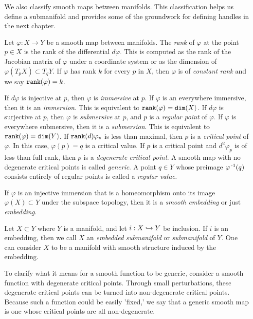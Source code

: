 We also classify smooth maps between manifolds.
This classification helps us define a submanifold and provides some of the groundwork for defining handles in the next chapter.

\begin{defn}[Embedding]
	Let $\varphi:X\to Y$ be a smooth map between manifolds.
	The \emph{rank} of $\varphi$ at the point $p\in X$ is the rank of the differential $d\varphi$.
	This is computed as the rank of the Jacobian matrix of $\varphi$ under a coordinate system or as the dimension of $\varphi(T_p X)\subset T_q Y$.
	If $\varphi$ has rank $k$ for every $p$ in $X$, then $\varphi$ is of \emph{constant rank} and we say $\texttt{rank}(\varphi)=k$.
	 
	If $d\varphi$ is injective at $p$, then $\varphi$ is \emph{immersive} at $p$.
	If $\varphi$ is an everywhere immersive, then it is an \emph{immersion}.
	This is equivalent to $\texttt{rank}(\varphi)=\texttt{dim}(X)$.
	If $d\varphi$ is surjective at $p$, then $\varphi$ is \emph{submersive} at $p$, and $p$ is a \emph{regular point} of $\varphi$.
	If $\varphi$ is everywhere submersive, then it is a \emph{submersion}.
	This is equivalent to $\texttt{rank}(\varphi)=\texttt{dim}(Y)$.
	If $\texttt{rank}(d)\varphi_p$ is less than maximal, then $p$ is a \emph{critical point} of $\varphi$.
	In this case, $\varphi(p)=q$ is a critical value.
	If $p$ is a critical point and $d^2\varphi_p$ is of less than full rank, then $p$ is a \emph{degenerate critical point}.
	A smooth map with no degenerate critical points is called \emph{generic}.
	A point $q\in Y$ whose preimage $\varphi^{\,\text{-}1}(q)$ consists entirely of regular points is called a \emph{regular value}.
	
	If $\varphi$ is an injective immersion that is a homeomorphism onto its image $\varphi(X)\subset Y$ under the subspace topology, then it is a \emph{smooth embedding} or just \emph{embedding}.
	
	Let $X\subset Y$ where $Y$ is a manifold, and let $i:X\hookrightarrow Y$ be inclusion.
	If $i$ is an embedding, then we call $X$ an \emph{embedded submanifold} or \emph{submanifold} of $Y$.
	One can consider $X$ to be a manifold with smooth structure induced by the embedding.
\end{defn}

To clarify what it means for a smooth function to be generic, consider a smooth function with degenerate critical points.
Through small perturbations, these degenerate critical points can be turned into non-degenerate critical points.
Because such a function could be easily 'fixed,' we say that a generic smooth map is one whose critical points are all non-degenerate.

